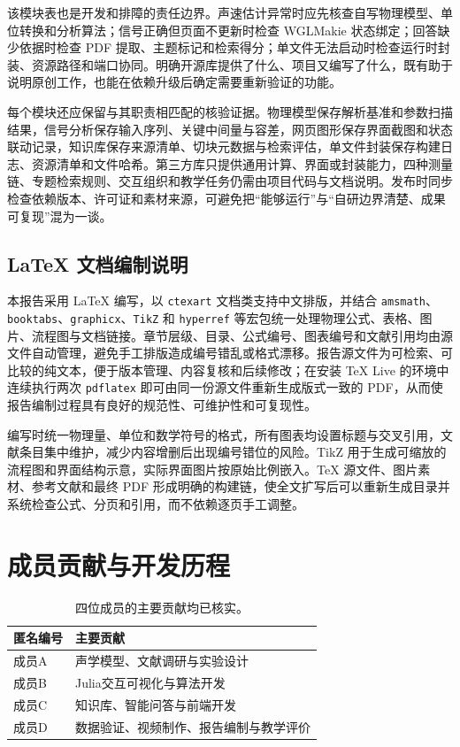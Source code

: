 \documentclass[UTF8,a4paper,zihao=-4]{ctexart}
\newcommand{\code}[1]{\texttt{#1}}
\begin{document}
该模块表也是开发和排障的责任边界。声速估计异常时应先核查自写物理模型、单位转换和分析算法；信号正确但页面不更新时检查 WGLMakie 状态绑定；回答缺少依据时检查 PDF 提取、主题标记和检索得分；单文件无法启动时检查运行时封装、资源路径和端口协同。明确开源库提供了什么、项目又编写了什么，既有助于说明原创工作，也能在依赖升级后确定需要重新验证的功能。

每个模块还应保留与其职责相匹配的核验证据。物理模型保存解析基准和参数扫描结果，信号分析保存输入序列、关键中间量与容差，网页图形保存界面截图和状态联动记录，知识库保存来源清单、切块元数据与检索评估，单文件封装保存构建日志、资源清单和文件哈希。第三方库只提供通用计算、界面或封装能力，四种测量链、专题检索规则、交互组织和教学任务仍需由项目代码与文档说明。发布时同步检查依赖版本、许可证和素材来源，可避免把“能够运行”与“自研边界清楚、成果可复现”混为一谈。

\subsection{\LaTeX{} 文档编制说明}
本报告采用 \LaTeX{} 编写，以 \code{ctexart} 文档类支持中文排版，并结合 \code{amsmath}、\code{booktabs}、\code{graphicx}、\code{TikZ} 和 \code{hyperref} 等宏包统一处理物理公式、表格、图片、流程图与文档链接。章节层级、目录、公式编号、图表编号和文献引用均由源文件自动管理，避免手工排版造成编号错乱或格式漂移。报告源文件为可检索、可比较的纯文本，便于版本管理、内容复核和后续修改；在安装 TeX Live 的环境中连续执行两次 \code{pdflatex} 即可由同一份源文件重新生成版式一致的 PDF，从而使报告编制过程具有良好的规范性、可维护性和可复现性。

编写时统一物理量、单位和数学符号的格式，所有图表均设置标题与交叉引用，文献条目集中维护，减少内容增删后出现编号错位的风险。TikZ 用于生成可缩放的流程图和界面结构示意，实际界面图片按原始比例嵌入。TeX 源文件、图片素材、参考文献和最终 PDF 形成明确的构建链，使全文扩写后可以重新生成目录并系统检查公式、分页和引用，而不依赖逐页手工调整。

\section{成员贡献与开发历程}

\begin{table}[!htb]
\centering
\begin{tabularx}{0.88\textwidth}{>{\centering\arraybackslash}p{2.2cm}>{\centering\arraybackslash}X}
\toprule
匿名编号 & 主要贡献\\
\midrule
成员A & 声学模型、文献调研与实验设计\\
成员B & Julia交互可视化与算法开发\\
成员C & 知识库、智能问答与前端开发\\
成员D & 数据验证、视频制作、报告编制与教学评价\\
\bottomrule
\end{tabularx}
\caption{四位成员的主要贡献均已核实。}
\end{table}
\end{document}
